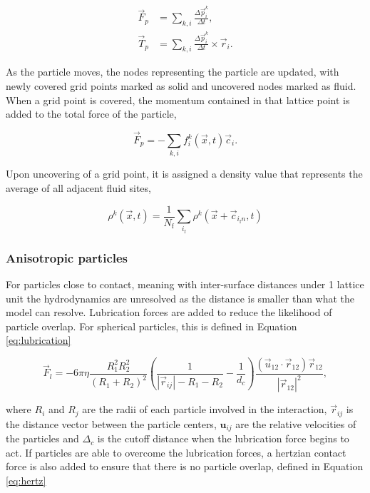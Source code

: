 \begin{equation}
    \begin{split}
    \vec{F}_p &= \sum_{k,i} \frac{\Delta \vec{p}^k_i}{\Delta t} , \\
    \vec{T}_p &= \sum_{k,i} \frac{\Delta\vec{p}^k_i}{\Delta t} \times \vec{r}_i .
    \end{split}
\end{equation}

As the particle moves, the nodes representing the particle are updated, with newly covered grid points marked as solid and 
uncovered nodes marked as fluid. When a grid point is covered, the momentum contained in that lattice point is added to the 
total force of the particle,

\begin{equation}
    \vec{F}_p = -\sum_{k,i} f_i^k(\vec{x},t)\vec{c}_i .
\end{equation}

Upon uncovering of a grid point, it is assigned a density value that represents the average of all adjacent fluid sites,

\begin{equation}
    \rho^k(\vec{x},t) = \frac{1}{N_{\text{f}}} \sum_{i_{\text{f}}} \rho^k(\vec{x}+\vec{c}_{i_{\text{f}}n}, t)
    \label{eq:fill_particles}
\end{equation}

\subsubsection{Anisotropic particles}
\label{section:lbm_colloids_ellipsoids}

For particles close to contact, meaning with inter-surface distances under 1 lattice unit the hydrodynamics are unresolved as the
distance is smaller than what the model can resolve. Lubrication forces are added to reduce the likelihood of particle overlap. For 
spherical particles, this is defined in Equation \eqref{eq:lubrication}

\begin{equation}
    \vec{F}_l = -6 \pi \eta \frac{R_1^2 R_2^2}{\left(R_1+R_2\right)^2}\left(\frac{1}{|\vec{r}_{ij}|-R_1-R_2}-\frac{1}{d_c}\right) \frac{\left(\vec{u}_{12}\cdot\vec{r}_{12}\right)\vec{r}_{12}}{|\vec{r}_{12}|^2} ,%
    \label{eq:lubrication}
\end{equation}

where $R_i$ and $R_j$ are the radii of each particle involved in the interaction, $\vec{r}_{ij}$ is the distance
vector between the particle centers, $\mathbf{u}_{ij}$ are the relative velocities of the particles and $\Delta_c$ 
is the cutoff distance when the lubrication force begins to act. If particles are able to overcome the lubrication forces, 
a hertzian contact force is also added to ensure that there is no particle overlap, defined in Equation \eqref{eq:hertz}

